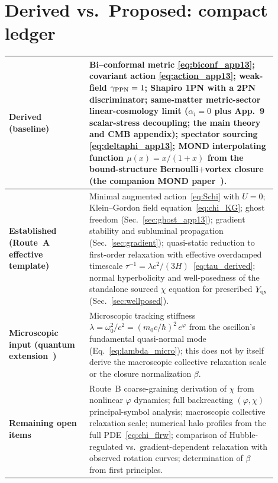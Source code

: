 \documentclass[11pt]{article}
\begin{document}
\section{Derived vs.\ Proposed: compact ledger}\label{sec:ledger_app13}
\begin{center}
\begin{tabular}{@{}p{0.27\linewidth}p{0.63\linewidth}@{}}
\toprule
\textbf{Derived (baseline)} &
Bi--conformal metric \eqref{eq:biconf_app13}; covariant action \eqref{eq:action_app13}; weak-field $\gamma_{\rm PPN}=1$; Shapiro 1PN with a 2PN discriminator; same-matter metric-sector linear-cosmology limit ($\alpha_i=0$ plus App.~9 scalar-stress decoupling; the main theory and CMB appendix); spectator sourcing \eqref{eq:deltaphi_app13}; MOND interpolating function $\mu(x)=x/(1+x)$ from the bound-structure Bernoulli$+$vortex closure (the companion MOND paper~\cite{Lotishvili2026MOND}).\\
\midrule
\textbf{Established (Route~A effective template)} &
Minimal augmented action~\eqref{eq:Schi} with $U=0$;
Klein--Gordon field equation~\eqref{eq:chi_KG};
ghost freedom (Sec.~\ref{sec:ghost_app13});
gradient stability and subluminal propagation
(Sec.~\ref{sec:gradient});
quasi-static reduction to first-order relaxation
with effective overdamped timescale
$\tau^{-1}=\lambda c^2/(3H)$~\eqref{eq:tau_derived};
normal hyperbolicity and well-posedness of the standalone sourced
$\chi$ equation for prescribed $Y_{\rm qs}$ (Sec.~\ref{sec:wellposed}).\\
\midrule
\textbf{Microscopic input (quantum extension~\cite{Lotishvili2026Q})} &
Microscopic tracking stiffness
$\lambda = \omega_0^2/c^2 = (m_0 c/\hbar)^2\,e^{\varphi}$
from the oscillon's fundamental quasi-normal mode
(Eq.~\ref{eq:lambda_micro}); this does not by itself derive the
macroscopic collective relaxation scale or the closure normalization
$\beta$.\\
\midrule
\textbf{Remaining open items} &
Route~B coarse-graining derivation of $\chi$ from
nonlinear $\varphi$ dynamics;
full backreacting $(\varphi,\chi)$ principal-symbol analysis;
macroscopic collective relaxation scale;
numerical halo profiles from the full
PDE~\eqref{eq:chi_flrw};
comparison of Hubble-regulated vs.\
gradient-dependent relaxation with observed
rotation curves;
determination of $\beta$ from first principles.\\
\bottomrule
\end{tabular}
\end{center}
\end{document}
